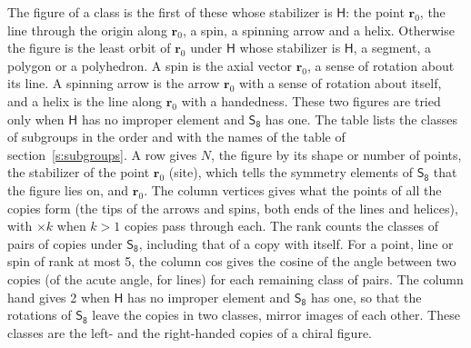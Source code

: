 \documentclass[10pt,a4paper]{article}
\numberwithin{equation}{section}
\newcommand{\grp}[1]{\mathsf{#1}}
\newcommand{\pointr}{\mathbf{r}}
\begin{document}
\leavevmode\label{n:head.figure}The figure of a class is the first of these whose stabilizer is $\grp{H}$: the point $\pointr_0$, the line through the origin along $\pointr_0$, a spin, a spinning arrow and a helix. Otherwise the figure is the least orbit of $\pointr_0$ under $\grp{H}$ whose stabilizer is $\grp{H}$, a segment, a polygon or a polyhedron. A spin is the axial vector $\pointr_0$, a sense of rotation about its line. A spinning arrow is the arrow $\pointr_0$ with a sense of rotation about itself, and a helix is the line along $\pointr_0$ with a handedness. These two figures are tried only when $\grp{H}$ has no improper element and $\grp{S_{8}}$ has one. The table lists the classes of subgroups in the order and with the names of the table of section~\ref{s:subgroups}. \label{n:head.site}A row gives $N$, the figure by its shape or number of points, the stabilizer of the point $\pointr_0$ (site), which tells the symmetry elements of $\grp{S_{8}}$ that the figure lies on, and $\pointr_0$. \label{n:head.vertices}The column vertices gives what the points of all the copies form (the tips of the arrows and spins, both ends of the lines and helices), with ${\times}k$ when $k > 1$ copies pass through each. \label{n:head.rank}The rank counts the classes of pairs of copies under $\grp{S_{8}}$, including that of a copy with itself. \label{n:head.cos}For a point, line or spin of rank at most 5, the column cos gives the cosine of the angle between two copies (of the acute angle, for lines) for each remaining class of pairs. \label{n:head.hand}The column hand gives 2 when $\grp{H}$ has no improper element and $\grp{S_{8}}$ has one, so that the rotations of $\grp{S_{8}}$ leave the copies in two classes, mirror images of each other. These classes are the left- and the right-handed copies of a chiral figure.
\end{document}
